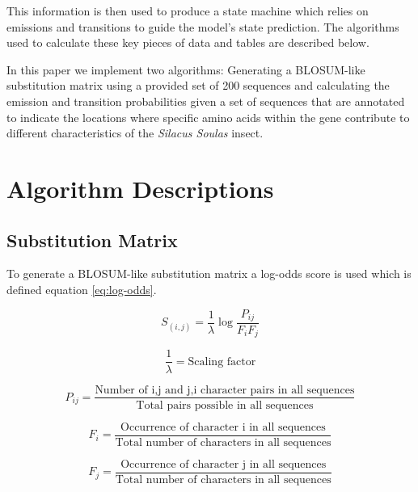 \documentclass[a4paper,11pt]{article}
\begin{document}
This information is then used to produce a state machine which relies on emissions and transitions to guide the model's state prediction. The algorithms used to calculate these key pieces of data and tables are described below.

In this paper we implement two algorithms: Generating a BLOSUM-like substitution matrix using a provided set of 200 sequences and calculating the emission and transition probabilities given a set of sequences that are annotated to indicate the locations where specific amino acids within the gene contribute to different characteristics of the \textit{Silacus Soulas} insect.


\section{Algorithm Descriptions}

\subsection{Substitution Matrix}

To generate a BLOSUM-like substitution matrix a log-odds score is used which is defined equation \ref{eq:log-odds}.

\begin{equation}
	\label{eq:log-odds}
	{S_{(i,j)}} = {\frac{1}{\lambda}} \log \frac{P_{ij}}{F_i F_j}
\end{equation}

\begin{equation}
	\label{eq:scaling factor}
	{\frac{1}{\lambda}} = \text{Scaling factor}
\end{equation}

\begin{equation}
	\label{eq:prob-pairs}
	{P_{ij}} = \frac{\text{Number of i,j and j,i character pairs in all sequences}}{\text{Total pairs possible in all sequences}}
\end{equation}

\begin{equation}
	\label{eq:prob-frequencyi}
	{F_{i}} = \frac{\text{Occurrence of character i in all sequences}} {\text{Total number of characters in all sequences}}
\end{equation}

\begin{equation}
	\label{eq:prob-frequencyj}
	{F_{j}} = \frac{\text{Occurrence of character j in all sequences}} {\text{Total number of characters in all sequences}}
\end{equation}
\end{document}
